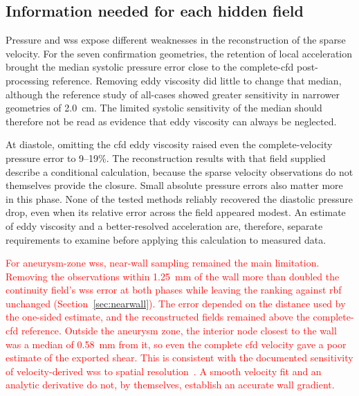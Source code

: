 \documentclass[12pt,a4paper]{article}
\newcommand{\CFD}{\ac{cfd}\xspace}
\newcommand{\WSS}{\ac{wss}\xspace}
\newcommand{\RBF}{\ac{rbf}\xspace}
\theoremstyle{definition}
\numberwithin{equation}{section}
\newcommand{\revision}[1]{\textcolor{red}{#1}}
\begin{document}
\subsection{Information needed for each hidden field}
Pressure and \WSS expose different weaknesses in the reconstruction of the sparse velocity. For the seven confirmation geometries, the retention of local acceleration brought the median systolic pressure error close to the complete-\CFD post-processing reference. Removing eddy viscosity did little to change that median, although the reference study of all-cases showed greater sensitivity in narrower geometries of 2.0~cm. The limited systolic sensitivity of the median should therefore not be read as evidence that eddy viscosity can always be neglected.

At diastole, omitting the \CFD eddy viscosity raised even the complete-velocity pressure error to 9--19\%. The reconstruction results with that field supplied describe a conditional calculation, because the sparse velocity observations do not themselves provide the closure. Small absolute pressure errors also matter more in this phase. None of the tested methods reliably recovered the diastolic pressure drop, even when its relative error across the field appeared modest. An estimate of eddy viscosity and a better-resolved acceleration are, therefore, separate requirements to examine before applying this calculation to measured data.

\revision{For aneurysm-zone \WSS, near-wall sampling remained the main limitation. Removing the observations within 1.25~mm of the wall more than doubled the continuity field's \WSS error at both phases while leaving the ranking against \RBF unchanged (Section~\ref{sec:nearwall}). The error depended on the distance used by the one-sided estimate, and the reconstructed fields remained above the complete-\CFD reference. Outside the aneurysm zone, the interior node closest to the wall was a median of 0.58~mm from it, so even the complete \CFD velocity gave a poor estimate of the exported shear. This is consistent with the documented sensitivity of velocity-derived \WSS to spatial resolution~\cite{petersson2012assessment,stalder2008quantitative}. A smooth velocity fit and an analytic derivative do not, by themselves, establish an accurate wall gradient.}
\end{document}
